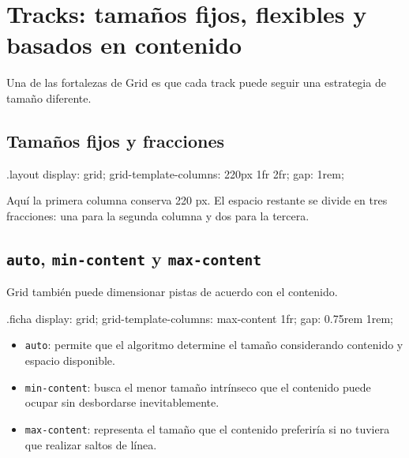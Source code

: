 \documentclass[11pt]{article}
\begin{document}

\section{Tracks: tamaños fijos, flexibles y basados en contenido}

Una de las fortalezas de Grid es que cada track puede seguir una estrategia de
tamaño diferente.

\subsection{Tamaños fijos y fracciones}

\begin{csscodedark}
.layout {
    display: grid;
    grid-template-columns: 220px 1fr 2fr;
    gap: 1rem;
}
\end{csscodedark}

Aquí la primera columna conserva 220 px. El espacio restante se divide en tres
fracciones: una para la segunda columna y dos para la tercera.

\subsection{\texttt{auto}, \texttt{min-content} y \texttt{max-content}}

Grid también puede dimensionar pistas de acuerdo con el contenido.

\begin{csscodedark}
.ficha {
    display: grid;
    grid-template-columns: max-content 1fr;
    gap: 0.75rem 1rem;
}
\end{csscodedark}

\begin{itemize}
    \item \texttt{auto}: permite que el algoritmo determine el tamaño considerando
    contenido y espacio disponible.
    \item \texttt{min-content}: busca el menor tamaño intrínseco que el contenido
    puede ocupar sin desbordarse inevitablemente.
    \item \texttt{max-content}: representa el tamaño que el contenido preferiría
    si no tuviera que realizar saltos de línea.
\end{itemize}
\end{document}
